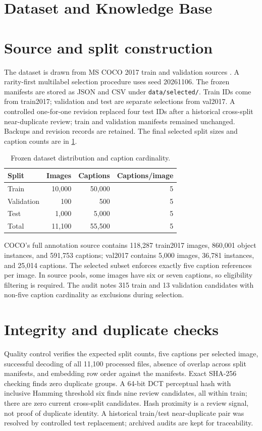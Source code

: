 \section{Dataset and Knowledge Base}\label{ch:data}
\section{Source and split construction}
The dataset is drawn from MS COCO 2017 train and validation sources \cite{lin2014coco}. A rarity-first multilabel selection procedure uses seed 20261106. The frozen manifests are stored as JSON and CSV under \texttt{data/selected/}. Train IDs come from train2017; validation and test are separate selections from val2017. A controlled one-for-one revision replaced four test IDs after a historical cross-split near-duplicate review; train and validation manifests remained unchanged. Backups and revision records are retained. The final selected split sizes and caption counts are in \cref{tab:dataset}.

\begin{table}[htbp]\centering\caption{Frozen dataset distribution and caption cardinality.}\label{tab:dataset}
\begin{tabular}{lrrr}\toprule Split & Images & Captions & Captions/image\\\midrule Train & 10,000 & 50,000 & 5\\Validation & 100 & 500 & 5\\Test & 1,000 & 5,000 & 5\\\midrule Total & 11,100 & 55,500 & 5\\\bottomrule\end{tabular}\end{table}

COCO's full annotation source contains 118,287 train2017 images, 860,001 object instances, and 591,753 captions; val2017 contains 5,000 images, 36,781 instances, and 25,014 captions. The selected subset enforces exactly five caption references per image. In source pools, some images have six or seven captions, so eligibility filtering is required. The audit notes 315 train and 13 validation candidates with non-five caption cardinality as exclusions during selection.

\section{Integrity and duplicate checks}
Quality control verifies the expected split counts, five captions per selected image, successful decoding of all 11,100 processed files, absence of overlap across split manifests, and embedding row order against the manifests. Exact SHA-256 checking finds zero duplicate groups. A 64-bit DCT perceptual hash with inclusive Hamming threshold six finds nine review candidates, all within train; there are zero current cross-split candidates. Hash proximity is a review signal, not proof of duplicate identity. A historical train/test near-duplicate pair was resolved by controlled test replacement; archived audits are kept for traceability.

